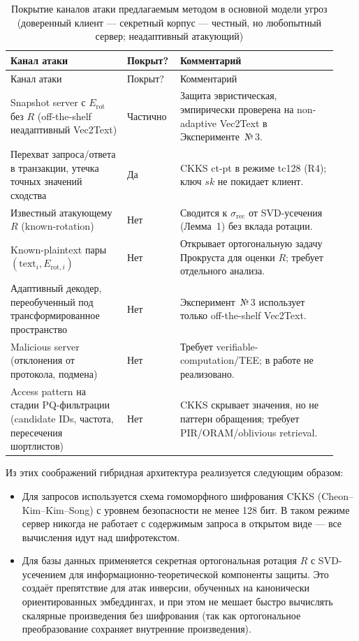 \documentclass[a4paper, 12pt, oneside, openany]{article}
\begin{document}
\begingroup\small\setlength{\tabcolsep}{4pt}
\begin{longtable}{@{}
		>{\raggedright\arraybackslash}p{0.34\linewidth}
		>{\centering\arraybackslash}p{0.13\linewidth}
		>{\raggedright\arraybackslash}p{0.46\linewidth}
		@{}}
	\caption{Покрытие каналов атаки предлагаемым методом в основной модели угроз (доверенный клиент --- секретный корпус --- честный, но любопытный сервер; неадаптивный атакующий)}\label{tab:threat-coverage}\\*
	\toprule
	Канал атаки & Покрыт? & Комментарий \\
	\midrule
	\endfirsthead

	\toprule
	Канал атаки & Покрыт? & Комментарий \\
	\midrule
	\endhead

	\bottomrule
	\endfoot

	\bottomrule
	\endlastfoot

	Snapshot server с $E_{\mathrm{rot}}$ без $R$ (off-the-shelf неадаптивный Vec2Text) & Частично & Защита эвристическая, эмпирически проверена на non-adaptive Vec2Text в Эксперименте~№\,3. \\
	Перехват запроса/ответа в транзакции, утечка точных значений сходства & Да & CKKS ct-pt в режиме tc128 (R4); ключ $sk$ не покидает клиент. \\
	Известный атакующему $R$ (known-rotation) & Нет & Сводится к $\sigma_{\mathrm{rec}}$ от SVD-усечения (Лемма~1) без вклада ротации. \\
	Known-plaintext пары $(\mathrm{text}_i, E_{\mathrm{rot},i})$ & Нет & Открывает ортогональную задачу Прокруста для оценки $R$; требует отдельного анализа. \\
	Адаптивный декодер, переобученный под трансформированное пространство & Нет & Эксперимент~№\,3 использует только off-the-shelf Vec2Text. \\
	Malicious server (отклонения от протокола, подмена) & Нет & Требует verifiable-computation/TEE; в работе не реализовано. \\
	Access pattern на стадии PQ-фильтрации (candidate IDs, частота, пересечения шортлистов) & Нет & CKKS скрывает значения, но не паттерн обращения; требует PIR/ORAM/oblivious retrieval. \\

\end{longtable}
\endgroup

Из этих соображений гибридная архитектура реализуется следующим образом:
\begin{itemize}
	\item
	Для запросов используется схема гомоморфного шифрования CKKS (Cheon--Kim--Kim--Song) с уровнем безопасности не менее 128 бит. В таком режиме сервер никогда не работает с содержимым запроса в открытом виде — все вычисления идут над шифротекстом.
	\item
	Для базы данных применяется секретная ортогональная ротация $R$ с SVD-усечением для информационно-теоретической компоненты защиты. Это создаёт препятствие для атак инверсии, обученных на канонически ориентированных эмбеддингах, и при этом не мешает быстро вычислять скалярные произведения без шифрования (так как ортогональное преобразование сохраняет внутренние произведения).
\end{itemize}
\end{document}
